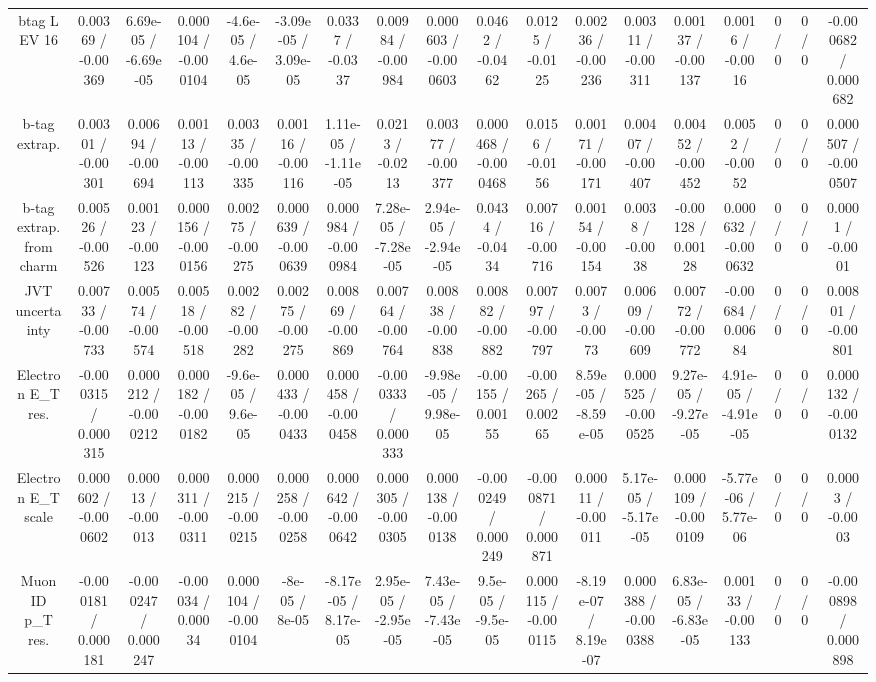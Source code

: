 \documentclass[10pt]{article}
\begin{document}
\begin{table}[htbp]
\begin{center}
\begin{tabular}{|c|c|c|c|c|c|c|c|c|c|c|c|c|c|c|c|c|c|}
  btag L EV 16 & 0.00369 / -0.00369 & 6.69e-05 / -6.69e-05 & 0.000104 / -0.000104 & -4.6e-05 / 4.6e-05 & -3.09e-05 / 3.09e-05 & 0.0337 / -0.0337 & 0.00984 / -0.00984 & 0.000603 / -0.000603 & 0.0462 / -0.0462 & 0.0125 / -0.0125 & 0.00236 / -0.00236 & 0.00311 / -0.00311 & 0.00137 / -0.00137 & 0.0016 / -0.0016 & 0 / 0 & 0 / 0 & -0.000682 / 0.000682 \\ 
  b-tag extrap. & 0.00301 / -0.00301 & 0.00694 / -0.00694 & 0.00113 / -0.00113 & 0.00335 / -0.00335 & 0.00116 / -0.00116 & 1.11e-05 / -1.11e-05 & 0.0213 / -0.0213 & 0.00377 / -0.00377 & 0.000468 / -0.000468 & 0.0156 / -0.0156 & 0.00171 / -0.00171 & 0.00407 / -0.00407 & 0.00452 / -0.00452 & 0.0052 / -0.0052 & 0 / 0 & 0 / 0 & 0.000507 / -0.000507 \\ 
  b-tag extrap. from charm & 0.00526 / -0.00526 & 0.00123 / -0.00123 & 0.000156 / -0.000156 & 0.00275 / -0.00275 & 0.000639 / -0.000639 & 0.000984 / -0.000984 & 7.28e-05 / -7.28e-05 & 2.94e-05 / -2.94e-05 & 0.0434 / -0.0434 & 0.00716 / -0.00716 & 0.00154 / -0.00154 & 0.0038 / -0.0038 & -0.00128 / 0.00128 & 0.000632 / -0.000632 & 0 / 0 & 0 / 0 & 0.0001 / -0.0001 \\ 
  JVT uncertainty & 0.00733 / -0.00733 & 0.00574 / -0.00574 & 0.00518 / -0.00518 & 0.00282 / -0.00282 & 0.00275 / -0.00275 & 0.00869 / -0.00869 & 0.00764 / -0.00764 & 0.00838 / -0.00838 & 0.00882 / -0.00882 & 0.00797 / -0.00797 & 0.0073 / -0.0073 & 0.00609 / -0.00609 & 0.00772 / -0.00772 & -0.00684 / 0.00684 & 0 / 0 & 0 / 0 & 0.00801 / -0.00801 \\ 
  Electron E_{T} res. & -0.000315 / 0.000315 & 0.000212 / -0.000212 & 0.000182 / -0.000182 & -9.6e-05 / 9.6e-05 & 0.000433 / -0.000433 & 0.000458 / -0.000458 & -0.000333 / 0.000333 & -9.98e-05 / 9.98e-05 & -0.00155 / 0.00155 & -0.00265 / 0.00265 & 8.59e-05 / -8.59e-05 & 0.000525 / -0.000525 & 9.27e-05 / -9.27e-05 & 4.91e-05 / -4.91e-05 & 0 / 0 & 0 / 0 & 0.000132 / -0.000132 \\ 
  Electron E_{T} scale & 0.000602 / -0.000602 & 0.00013 / -0.00013 & 0.000311 / -0.000311 & 0.000215 / -0.000215 & 0.000258 / -0.000258 & 0.000642 / -0.000642 & 0.000305 / -0.000305 & 0.000138 / -0.000138 & -0.000249 / 0.000249 & -0.000871 / 0.000871 & 0.00011 / -0.00011 & 5.17e-05 / -5.17e-05 & 0.000109 / -0.000109 & -5.77e-06 / 5.77e-06 & 0 / 0 & 0 / 0 & 0.0003 / -0.0003 \\ 
  Muon ID p_{T} res. & -0.000181 / 0.000181 & -0.000247 / 0.000247 & -0.00034 / 0.00034 & 0.000104 / -0.000104 & -8e-05 / 8e-05 & -8.17e-05 / 8.17e-05 & 2.95e-05 / -2.95e-05 & 7.43e-05 / -7.43e-05 & 9.5e-05 / -9.5e-05 & 0.000115 / -0.000115 & -8.19e-07 / 8.19e-07 & 0.000388 / -0.000388 & 6.83e-05 / -6.83e-05 & 0.00133 / -0.00133 & 0 / 0 & 0 / 0 & -0.000898 / 0.000898 \\ 

\end{tabular}
\end{center}
\end{table}
\end{document}
